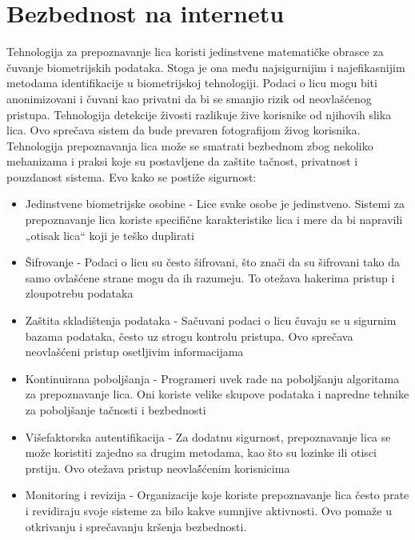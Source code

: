 \documentclass[a4paper]{article}
\begin{document}
\section{Bezbednost na internetu}
\label{sec:Bezbednost na internetu}
Tehnologija za prepoznavanje lica koristi jedinstvene matematičke obrasce za čuvanje biometrijskih podataka. Stoga je ona među najsigurnijim i najefikasnijim metodama identifikacije u biometrijskoj tehnologiji. Podaci o licu mogu biti anonimizovani i čuvani kao privatni da bi se smanjio rizik od neovlašćenog pristupa. Tehnologija detekcije živosti razlikuje žive korisnike od njihovih slika lica. Ovo sprečava sistem da bude prevaren fotografijom živog korisnika.\cite{2}
Tehnologija prepoznavanja lica može se smatrati bezbednom zbog nekoliko mehanizama i praksi koje su postavljene da zaštite tačnost, privatnost i pouzdanost sistema. Evo kako se postiže sigurnost:
\begin{itemize}
\item Jedinstvene biometrijske osobine -
Lice svake osobe je jedinstveno. Sistemi za prepoznavanje lica koriste specifične karakteristike lica i mere da bi napravili „otisak lica“ koji je teško duplirati
\item  Šifrovanje - Podaci o licu su često šifrovani, što znači da su šifrovani tako da samo ovlašćene strane mogu da ih razumeju. To otežava hakerima pristup i zloupotrebu podataka
\item   Zaštita skladištenja podataka -
Sačuvani podaci o licu čuvaju se u sigurnim bazama podataka, često uz strogu kontrolu pristupa. Ovo sprečava neovlašćeni pristup osetljivim informacijama
\item Kontinuirana poboljšanja -
Programeri uvek rade na poboljšanju algoritama za prepoznavanje lica. Oni koriste velike skupove podataka i napredne tehnike za poboljšanje tačnosti i bezbednosti
\item Višefaktorska autentifikacija -
Za dodatnu sigurnost, prepoznavanje lica se može koristiti zajedno sa drugim metodama, kao što su lozinke ili otisci prstiju. Ovo otežava pristup neovlaš́ćenim korisnicima
\item  Monitoring i revizija -
Organizacije koje koriste prepoznavanje lica često prate i revidiraju svoje sisteme za bilo kakve sumnjive aktivnosti. Ovo pomaže u otkrivanju i sprečavanju kršenja bezbednosti.
\end{itemize}  
\end{document}
